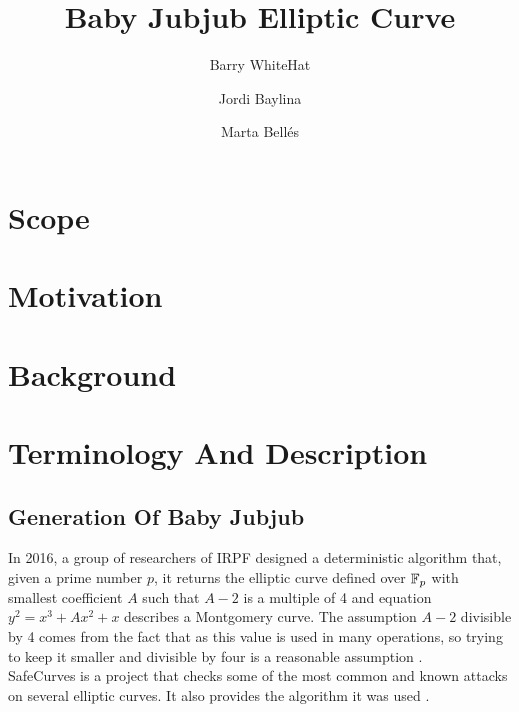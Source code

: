 \documentclass{article}
\title{ Baby Jubjub Elliptic Curve \vspace{-0.2cm} }
\author[1]{Barry WhiteHat}
\author[2]{Jordi Baylina}
\author[2,3]{Marta Bellés}
\affil[1]{Ethereum foundation}
\affil[2]{iden3}
\affil[3]{Universitat Pompeu Fabra}
\date{} %
\begin{document}
\begin{spacing}{1.2}	
\maketitle 
\vspace{1.5cm}
\tableofcontents
\vspace{0.5cm}


\newpage

\section{Scope}
	

\section{Motivation}
	

\section{Background}
	

\section{Terminology And Description}
	\subsection{Generation Of Baby Jubjub}

	In 2016, a group of researchers of IRPF designed a deterministic algorithm that, given a prime number $p$, it returns the elliptic curve defined over $\mathbb{F}_p$ with smallest coefficient $A$ such that $A-2$ is a multiple of 4 and equation $y^2 = x^3 + Ax^2 + x$ describes a Montgomery curve. The assumption $A-2$ divisible by 4 comes from the fact that as 
	this value is used in many operations, so trying to keep it smaller and divisible by four is a reasonable assumption \cite{generation-baby}. \\

	SafeCurves is a project that checks some of the most common and known attacks on several elliptic curves. It also provides the algorithm it was used \cite{safe-curves}.\\ 
	

\end{spacing}
\end{document}
